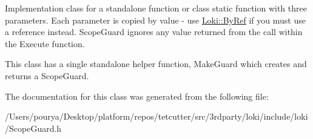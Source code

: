 Implementation class for a standalone function or class static function with three parameters. Each parameter is copied by value -\/ use \hyperlink{group__ExceptionGroup_ga0a94ba0342e6abcdb8f9b32ed5ad7e3d}{Loki\+::\+By\+Ref} if you must use a reference instead. Scope\+Guard ignores any value returned from the call within the Execute function.

This class has a single standalone helper function, Make\+Guard which creates and returns a Scope\+Guard. 

The documentation for this class was generated from the following file\+:\begin{DoxyCompactItemize}
\item 
/\+Users/pourya/\+Desktop/platform/repos/tetcutter/src/3rdparty/loki/include/loki/Scope\+Guard.\+h\end{DoxyCompactItemize}
